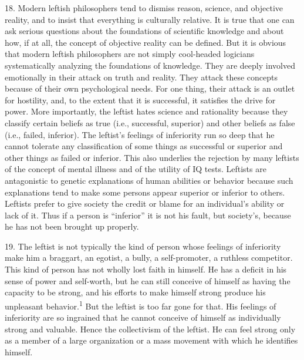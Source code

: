 \documentclass{article}
\begin{document}
18.  Modern leftish philosophers tend to dismiss reason, science, and objective reality, and to insist 
that  everything  is  culturally  relative.    It  is  true  that  one  can  ask  serious  questions  about  the  
foundations of scientific knowledge and about how, if at all, the concept of objective reality can 
be defined.  But it is obvious that modern leftish philosophers are not simply cool-headed logicians 
systematically analyzing the foundations of knowledge.  They are deeply involved emotionally in 
their attack on truth and reality.  They attack these concepts because of their own psychological 
needs.  For one thing, their attack is an outlet for hostility, and, to the extent that it is successful, it 
satisfies the drive for power.  More importantly, the leftist hates science and rationality because 
they classify certain beliefs as true (i.e., successful, superior) and other beliefs as false (i.e., failed, 
inferior).  The leftist’s feelings of inferiority run so deep that he cannot tolerate any classification 
of some things as successful or superior and other things as failed or inferior.  This also underlies 
the rejection by many leftists of the concept of mental illness and of the utility of IQ tests.  Leftists 
are antagonistic to genetic explanations of human abilities or behavior because such explanations 
tend to make some persons appear superior or inferior to others.  Leftists prefer to give society the 
credit or blame for an individual’s ability or lack of it.  Thus if a person is “inferior” it is not his 
fault, but society’s, because he has not been brought up properly. \vspace{\baselineskip}

19.  The leftist is not typically the kind of person whose feelings of inferiority make him a braggart,
an egotist, a bully, a self-promoter, a ruthless competitor.  This kind of person has not wholly lost 
faith in himself.  He has a deficit in his sense of power and self-worth, but he can still conceive of 
himself  as  having  the  capacity  to  be  strong,  and  his  efforts  to  make  himself  strong  produce  his  
unpleasant behavior.\textsuperscript{1} But  the  leftist  is  too  far  gone  for  that.   His  feelings  of  inferiority  are  so  
ingrained  that  he  cannot  conceive  of  himself  as  individually  strong  and  valuable.   Hence  the  
collectivism of the leftist.  He can feel strong only as a member of a large organization or a mass 
movement with which he identifies himself. \vspace{\baselineskip}
\end{document}
